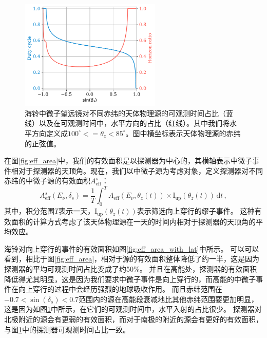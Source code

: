 \begin{figure}[!htb]%
    \centering
    \includegraphics[width=0.60\textwidth]{img/source_zenith_duty_cycle.pdf}
    \caption{海铃中微子望远镜对不同赤纬的天体物理源的可观测时间占比（蓝线）以及在可观测时间中，水平方向的占比（红线）。其中我们将水平方向定义成$100^\circ<= \theta_z <85^\circ$。图中横坐标表示天体物理源的赤纬的正弦值。}
    \label{fig:source_zenith_duty_cycle}
\end{figure}

在图\ref{fig:eff_area}中，我们的有效面积是以探测器为中心的，其横轴表示中微子事件相对于探测器的天顶角。现在，我们以中微子源为考虑对象，定义探测器对不同赤纬的中微子源的有效面积$A_\mathrm{eff}^s$：
\begin{equation}
    A_\mathrm{eff}^s(E_\nu, \delta_s) = \frac{1}{T} \int_0^T A_\mathrm{eff}(E_\nu, \theta_z(t)) \times \mathrm{I}_\mathrm{up}(\theta_z(t)) \, \mathrm{d} t \,   ,
\end{equation}
其中，积分范围$T$表示一天，$\mathrm{I}_\mathrm{up}(\theta_z(t))$表示筛选向上穿行的缪子事件。
这种有效面积的计算方式考虑了该天体物理源在一天的时间内相对于探测器的天顶角的平均效应。

海铃对向上穿行的事件的有效面积如图\ref{fig:eff_area_with_lat}中所示。
可以可以看到，相比于图\ref{fig:eff_area}，相对于源的有效面积整体降低了约一半，这是因为探测器的平均可观测时间占比变成了约50\%。
并且在高能处，探测器的有效面积降低得尤其明显，这是因为我们要求中微子事件是向上穿行的，而高能的中微子事件在向上穿行的过程中会经历强烈的地球吸收作用。
而且赤纬范围在$-0.7 < \sin(\delta_s) < 0.7$范围内的源在高能段衰减地比其他赤纬范围要更加明显，这是因为如图\ref{fig:source_zenith_duty_cycle}中所示，在它们的可观测时间中，水平入射的占比很少。
探测器对北极附近的源会有更弱的有效面积，而对于南极的附近的源会有更好的有效面积，与图\ref{fig:source_zenith_duty_cycle}中的探测器可观测时间占比一致。

